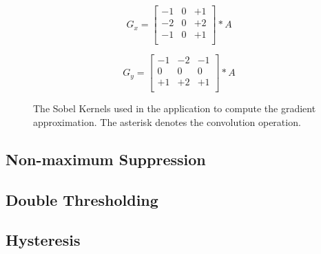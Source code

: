 \begin{figure}
    \begin{displaymath}
        G_{x} = \begin{bmatrix}
            -1 & 0 & +1 \\
            -2 & 0 & +2 \\
            -1 & 0 & +1 \\
        \end{bmatrix} \ast A
    \end{displaymath}

    \begin{displaymath}
        G_{y} = \begin{bmatrix}
            -1 & -2 & -1 \\
            0 & 0 & 0 \\
            +1 & +2 & +1 \\
        \end{bmatrix} \ast A
    \end{displaymath}
    \caption{The Sobel Kernels used in the application to compute the gradient approximation. The asterisk denotes the convolution operation. }
    \label{fig:sobelmat}
\end{figure}

\subsection{Non-maximum Suppression}
\label{subsec:non-maximum-suppression}

\subsection{Double Thresholding}
\label{subsec:double-thresholding}

\subsection{Hysteresis}
\label{subsec:hysteresis}
